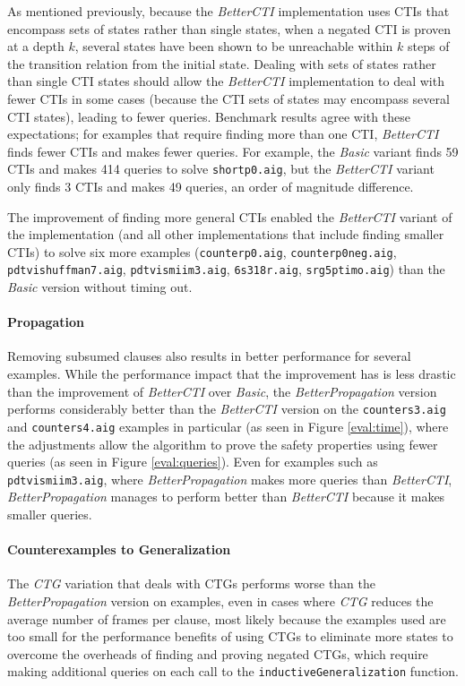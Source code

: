 \documentclass[12pt,a4paper,twoside,openright]{report}
\begin{document}
{{As mentioned previously, because the \emph{BetterCTI} implementation uses
CTIs that encompass sets of states rather than single states, when a negated CTI is proven at a depth
$k$, several states have been shown to be unreachable within $k$ steps of the transition relation
from the initial state. Dealing with sets of states rather than single CTI states should allow
the \emph{BetterCTI} implementation to deal with fewer CTIs in some cases (because the CTI sets of states
may encompass several CTI states), leading to fewer queries. Benchmark results
agree with these expectations; for examples that require finding more than one CTI, \emph{BetterCTI}
finds fewer CTIs and makes fewer queries. For example, the \emph{Basic} variant finds 59
CTIs and makes 414 queries to solve \verb,shortp0.aig,, but the \emph{BetterCTI} variant only
finds 3 CTIs and makes 49 queries, an order of magnitude difference.

The improvement of finding more general CTIs enabled the \emph{BetterCTI} variant of the implementation
(and all other implementations that include finding smaller CTIs) to
solve six more examples (\verb,counterp0.aig,, \verb,counterp0neg.aig,, \verb,pdtvishuffman7.aig,, 
\verb,pdtvismiim3.aig,, \verb,6s318r.aig,, \verb,srg5ptimo.aig,) than the \emph{Basic} version without
timing out.}

\paragraph{Propagation}{
Removing subsumed clauses also results in better performance for several examples.
While the performance impact that the improvement has is less drastic than the improvement of
\emph{BetterCTI} over \emph{Basic}, the \emph{BetterPropagation} version performs
considerably better
than the \emph{BetterCTI} version on the \verb,counters3.aig, and \verb,counters4.aig, examples in
particular (as seen in Figure \ref{eval:time}), where the adjustments allow the algorithm to prove the safety properties using fewer
queries (as seen in Figure \ref{eval:queries}). Even for examples such as \verb,pdtvismiim3.aig,, where \emph{BetterPropagation} makes more
queries than \emph{BetterCTI}, \emph{BetterPropagation} manages to perform better than \emph{BetterCTI}
because it makes smaller queries.}

\paragraph{Counterexamples to Generalization}{
The \emph{CTG} variation that deals with CTGs performs worse than the \emph{BetterPropagation} version
on examples, even in cases where \emph{CTG} reduces the average number of frames per clause,
most likely because the examples used are too small for the performance benefits of using CTGs to
eliminate more states to overcome the overheads of finding and proving negated CTGs, which require
making additional queries on each call to the \verb,inductiveGeneralization, function.

}}
\end{document}
